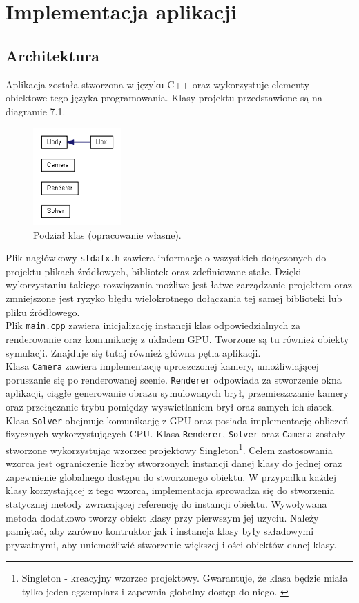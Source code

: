\chapter{Implementacja aplikacji}

\section{Architektura}
Aplikacja została stworzona w języku C++ oraz wykorzystuje elementy obiektowe tego języka programowania. Klasy projektu przedstawione są na diagramie 7.1.\\
\begin{figure}[h]
\centering
\includegraphics[width=0.3\textwidth]{figures/classes.png}
\caption{Podział klas (opracowanie własne).}%
\label{rys:Podzial klas}
\end{figure}
Plik nagłówkowy \verb$stdafx.h$ zawiera informacje o wszystkich dołączonych do projektu plikach źródłowych, bibliotek oraz zdefiniowane stałe. Dzięki wykorzystaniu takiego rozwiązania możliwe jest łatwe zarządzanie projektem oraz zmniejszone jest ryzyko błędu wielokrotnego dołączania tej samej biblioteki lub pliku źródłowego.\\
Plik \verb$main.cpp$ zawiera inicjalizację instancji klas odpowiedzialnych za renderowanie oraz komunikację z układem GPU. Tworzone są tu również obiekty symulacji. Znajduje się tutaj również główna pętla aplikacji.\\
Klasa \verb$Camera$ zawiera implementację uproszczonej kamery, umożliwiającej poruszanie się po renderowanej scenie.
\verb$Renderer$ odpowiada za stworzenie okna aplikacji, ciągłe generowanie obrazu symulowanych brył, przemieszczanie kamery oraz przełączanie trybu pomiędzy wyswietlaniem brył oraz samych ich siatek.
Klasa \verb$Solver$ obejmuje komunikację z GPU oraz posiada implementację obliczeń fizycznych wykorzystujących CPU.
Klasa \verb$Renderer$, \verb$Solver$ oraz \verb$Camera$ zostały stworzone wykorzystując wzorzec projektowy Singleton\footnote{Singleton - kreacyjny wzorzec projektowy. Gwarantuje, że klasa będzie miała tylko jeden egzemplarz i zapewnia globalny dostęp do niego. \cite{Wzorce projektowe}}. Celem zastosowania wzorca jest ograniczenie liczby stworzonych instancji danej klasy do jednej oraz zapewnienie globalnego dostępu do stworzonego obiektu. W przypadku każdej klasy korzystającej z tego wzorca, implementacja sprowadza się do stworzenia statycznej metody zwracającej referencję do instancji obiektu. Wywoływana metoda dodatkowo tworzy obiekt klasy przy pierwszym jej uzyciu. Należy pamiętać, aby zarówno kontruktor jak i instancja klasy były składowymi prywatnymi, aby uniemożliwić stworzenie większej ilości obiektów danej klasy.\\
